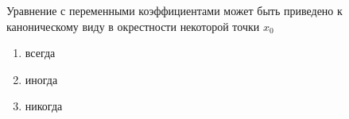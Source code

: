 Уравнение с переменными коэффициентами может быть приведено к каноническому виду в окрестности некоторой точки \(x_0\)

\begin{enumerate}[label=\arabic*)]
    \item всегда
    \item иногда
    \item никогда
\end{enumerate}

